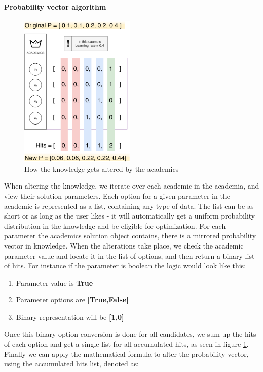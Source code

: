 \documentclass[a4paper,english]{report}
\begin{document}
		\paragraph{Probability vector algorithm}
		\begin{figure}
			\caption{How the knowledge gets altered by the academics}
			\label{fig:memory_insight}
			\includegraphics[width=5.5cm]{memory_insight}
		\end{figure} 
		When altering the knowledge, we iterate over each academic in the academia, and view their solution parameters. Each option for a given parameter in the academic is represented as a list, containing any type of data. The list can be as short or as long as the user likes - it will automatically get a uniform probability distribution in the knowledge and be eligible for optimization. For each parameter the academics solution object contains, there is a mirrored probability vector in knowledge. When the alterations take place, we check the academic parameter value and locate it in the list of options, and then return a binary list of hits. For instance if the parameter is boolean the logic would look like this:
		\begin{enumerate}
			\item Parameter value is \textbf{True}
			\item Parameter options are \textbf{[True,False]}
			\item Binary representation will be \textbf{[1,0]}
		\end{enumerate}
		Once this binary option conversion is done for all candidates, we sum up the hits of each option and get a single list for all accumulated hits, as seen in figure \ref{fig:memory_insight}. Finally we can apply the mathematical formula to alter the probability vector, using the accumulated hits list, denoted as:\\
\end{document}
